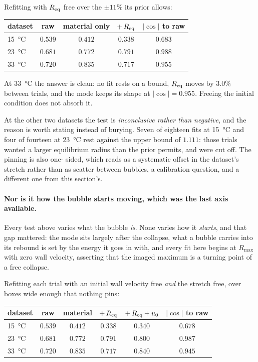 \documentclass[10pt]{article}
\begin{document}
Refitting with $R_{\rm eq}$ free over the $\pm 11\%$ its prior allows:

\begin{center}
\begin{tabular}{lcccc}
\toprule
dataset & raw & material only & $+\,R_{\rm eq}$ & $\lvert\cos\rvert$ to raw \\
\midrule
\SI{15}{\celsius} & $0.539$ & $0.412$ & $0.338$ & $0.683$ \\
\SI{23}{\celsius} & $0.681$ & $0.772$ & $\mathbf{0.791}$ & $\mathbf{0.988}$ \\
\SI{33}{\celsius} & $0.720$ & $0.835$ & $\mathbf{0.717}$ & $\mathbf{0.955}$ \\
\bottomrule
\end{tabular}
\end{center}

\noindent At \SI{33}{\celsius} the answer is clean: no fit rests on a bound, $R_{\rm eq}$ moves
by $3.0\%$ between trials, and the mode keeps its shape at $\lvert\cos\rvert = 0.955$. Freeing
the initial condition does not absorb it.

At the other two datasets the test is \emph{inconclusive rather than negative}, and the reason is
worth stating instead of burying. Seven of eighteen fits at \SI{15}{\celsius} and four of
fourteen at \SI{23}{\celsius} rest against the upper bound of $1.111$: those trials wanted a
larger equilibrium radius than the prior permits, and were cut off. The pinning is also one-
sided, which reads as a systematic offset in the dataset's stretch rather than as scatter between
bubbles, a calibration question, and a different one from this section's.

\paragraph{Nor is it how the bubble starts moving, which was the last axis available.}
Every test above varies what the bubble \emph{is}. None varies how it \emph{starts}, and that
gap mattered: the mode sits largely after the collapse, what a bubble carries into its rebound is
set by the energy it goes in with, and every fit here begins at $R_{\max}$ with zero wall
velocity, asserting that the imaged maximum is a turning point of a free collapse.

Refitting each trial with an initial wall velocity free \emph{and} the stretch free, over boxes
wide enough that nothing pins:

\begin{center}
\begin{tabular}{lccccc}
\toprule
dataset & raw & material & $+\,R_{\rm eq}$ & $+\,R_{\rm eq}+u_0$ & $\lvert\cos\rvert$ to raw \\
\midrule
\SI{15}{\celsius} & $0.539$ & $0.412$ & $0.338$ & $0.340$ & $0.678$ \\
\SI{23}{\celsius} & $0.681$ & $0.772$ & $0.791$ & $\mathbf{0.800}$ & $\mathbf{0.987}$ \\
\SI{33}{\celsius} & $0.720$ & $0.835$ & $0.717$ & $\mathbf{0.840}$ & $\mathbf{0.945}$ \\
\bottomrule
\end{tabular}
\end{center}
\end{document}
